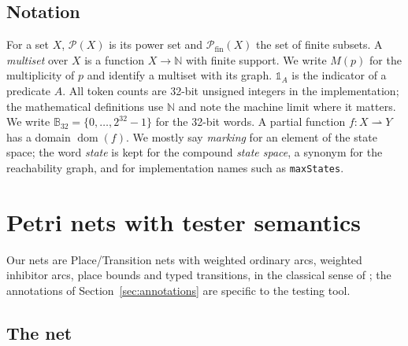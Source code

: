 \documentclass[11pt,a4paper]{article}
\newcommand{\N}{\mathbb{N}}
\newcommand{\Pow}{\mathcal{P}}
\newcommand{\B}{\mathbb{B}_{32}}
\begin{document}
\subsection{Notation}

For a set $X$, $\Pow(X)$ is its power set and $\Pow_{\mathrm{fin}}(X)$ the set
of finite subsets.  A \emph{multiset} over $X$ is a function $X\to\N$ with
finite support.  We write $M(p)$ for the multiplicity of $p$ and identify a
multiset with its graph.  $\mathbb{1}_{A}$ is the indicator of a predicate
$A$.  All token counts are 32-bit unsigned integers in the implementation;
the mathematical definitions use $\N$ and note the machine limit where it
matters.  We write $\B=\{0,\dots,2^{32}-1\}$ for the 32-bit words.  A partial
function $f\colon X\rightharpoonup Y$ has a domain
$\operatorname{dom}(f)$.  We mostly say \emph{marking} for an element of the
state space; the word \emph{state} is kept for the compound \emph{state space},
a synonym for the reachability graph, and for implementation names such as
\texttt{maxStates}.

\section{Petri nets with tester semantics}\label{sec:nets}

Our nets are Place/Transition nets with weighted ordinary arcs, weighted
inhibitor arcs, place bounds and typed transitions, in the classical sense of
\cite{petri1962kommunikation,murata1989petri}; the annotations of
Section~\ref{sec:annotations} are specific to the testing tool.

\subsection{The net}
\end{document}
